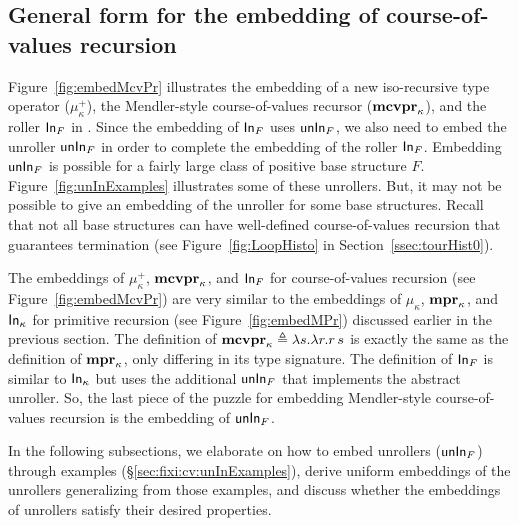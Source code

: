 \subsection{General form for the embedding of course-of-values recursion}
Figure~\ref{fig:embedMcvPr} illustrates the embedding of
a new iso-recursive type operator ($\mu^{+}_\kappa$),
the Mendler-style course-of-values recursor ($\mathbf{mcvpr}_\kappa$),
and the roller $\mathsf{In}_F$ in \Fixi. Since the embedding of $\mathsf{In}_F$ uses $\mathsf{unIn}_F$,
we also need to embed the unroller $\mathsf{unIn}_F$ in order to complete the embedding
of the roller $\mathsf{In}_F$. Embedding $\mathsf{unIn}_F$ is possible for a fairly large class
of positive base structure $F$. Figure~\ref{fig:unInExamples} illustrates
some of these unrollers. But, it may not be possible to give an embedding
of the unroller for some base structures. Recall that not all base structures
can have well-defined course-of-values recursion that guarantees termination
(see Figure~\ref{fig:LoopHisto} in Section~\ref{ssec:tourHist0}).

The embeddings of $\mu^{+}_\kappa$, $\mathbf{mcvpr}_\kappa$, and $\mathsf{In}_F$
for course-of-values recursion (see Figure~\ref{fig:embedMcvPr}) are
very similar to the embeddings of $\mu_\kappa$, $\mathbf{mpr}_\kappa$, and $\mathsf{In}_\kappa$
for primitive recursion (see Figure~\ref{fig:embedMPr}) discussed earlier
in the previous section. The definition of
$\mathbf{mcvpr}_\kappa \triangleq \lambda s.\lambda r.r\,s$ is exactly the same as
the definition of $\mathbf{mpr}_\kappa$, only differing in its type signature.
The definition of $\mathsf{In}_F$ is similar to $\mathsf{In}_\kappa$ but uses the additional
$\mathsf{unIn}_F$ that implements the abstract unroller. So, the last piece
of the puzzle for embedding Mendler-style course-of-values recursion is
the embedding of $\mathsf{unIn}_F$.

In the following subsections, we elaborate on how to embed unrollers
($\mathsf{unIn}_F$) through examples (\S\ref{sec:fixi:cv:unInExamples}), derive
uniform embeddings of the unrollers generalizing from those examples, and
discuss whether the embeddings of unrollers satisfy their desired properties.

